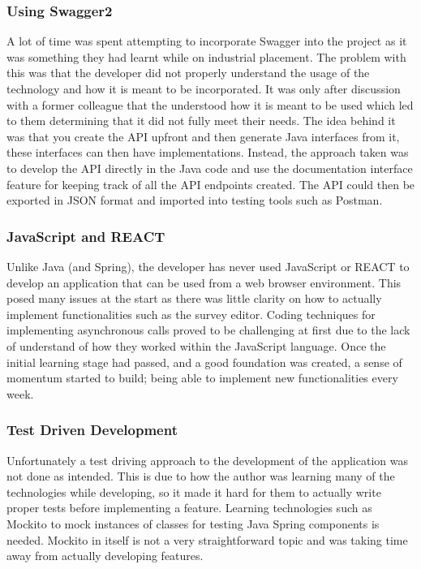 \subsubsection*{Using Swagger2}
A lot of time was spent attempting to incorporate Swagger into the project as it was something they had learnt while on industrial placement.
The problem with this was that the developer did not properly understand the usage of the technology and how it is meant to be incorporated.
It was only after discussion with a former colleague that the understood how it is meant to be used which led to them determining that it did 
not fully meet their needs. 
The idea behind it was that you create the API upfront and then generate Java interfaces from it, these interfaces can then have implementations.
Instead, the approach taken was to develop the API directly in the Java code and use the documentation interface feature for keeping track of
all the API endpoints created.
The API could then be exported in JSON format and imported into testing tools such as Postman.

\subsubsection*{JavaScript and REACT}

Unlike Java (and Spring), the developer has never used JavaScript or REACT to develop an application that can be used from a web browser 
environment.
This posed many issues at the start as there was little clarity on how to actually implement functionalities such as the survey editor.
Coding techniques for implementing asynchronous calls proved to be challenging at first due to the lack of understand of how they worked within the 
JavaScript language.
Once the initial learning stage had passed, and a good foundation was created, a sense of momentum started to build; being able to implement new 
functionalities every week.

\subsubsection*{Test Driven Development}

Unfortunately a test driving approach to the development of the application was not done as intended.
This is due to how the author was learning many of the technologies while developing, so it made it hard for them to actually write proper tests
before implementing a feature.
Learning technologies such as Mockito to mock instances of classes for testing Java Spring components is needed.
Mockito in itself is not a very straightforward topic and was taking time away from actually developing features.

